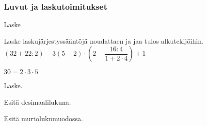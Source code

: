 \subsubsection*{Luvut ja laskutoimitukset}

\begin{tehtava}
	Laske

\begin{vastaus}

\end{vastaus}
\end{tehtava}

\begin{tehtava}
	Laske laskujärjestyssääntöjä noudattaen ja jaa tulos alkutekijöihin.
	$(32+22:2)-3(5-2)\cdot\left(2-\dfrac{16:4}{1+2\cdot4}\right)+1$
\begin{vastaus}
	$30=2\cdot3\cdot5$

\end{vastaus}
\end{tehtava}

\begin{tehtava}
	Laske.

\begin{vastaus}
\end{vastaus}
\end{tehtava}

\begin{tehtava}
	Esitä desimaalilukuna.

\begin{vastaus}
\end{vastaus}
\end{tehtava}

\begin{tehtava}
	Esitä murtolukumuodossa.

\begin{vastaus}
\end{vastaus}
\end{tehtava}

